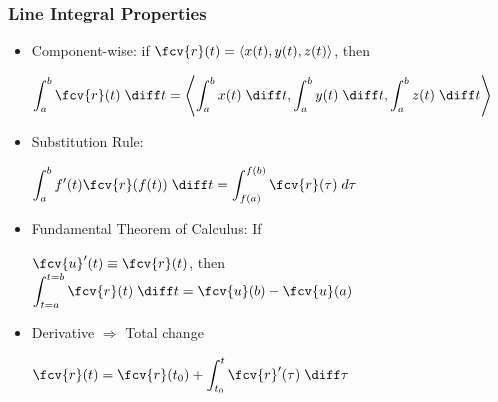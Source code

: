 \begin{frame}
\frametitle{Line Integral Properties}
\begin{itemize}
\item<1-> Component-wise: if $\fcv{r}(t) = \langle x(t), y(t), z(t) \rangle$, then
   
$\displaystyle \int_{a}^{b} \fcv{r}(t) \; \diff t = \left\langle \int_{a}^{b} x(t) \; \diff t, \int_{a}^{b} y(t) \; \diff t,\int_{a}^{b} z(t) \; \diff t \right\rangle$
    
\item<2-> Substitution Rule:

$\displaystyle\int_{a}^b f'(t) \fcv{r}(f(t)) \; \diff t = \int_{f(a)}^{f(b)} \fcv{r}(\tau) \; d\tau$
\item<3-> Fundamental Theorem of Calculus: If 
    
$\displaystyle\fcv{u}'(t)\equiv \fcv{r}(t)$, then $\displaystyle\int_{t=a}^{t=b} \fcv{r}(t) \; \diff t = \fcv{u}(b) - \fcv{u}(a)$
\item<4-> Derivative $\Longrightarrow$ Total change

$\displaystyle\fcv{r}(t) = \fcv{r}(t_0) + \int_{t_0}^t \fcv{r}'(\tau) \; \diff \tau$
\end{itemize}
\end{frame}